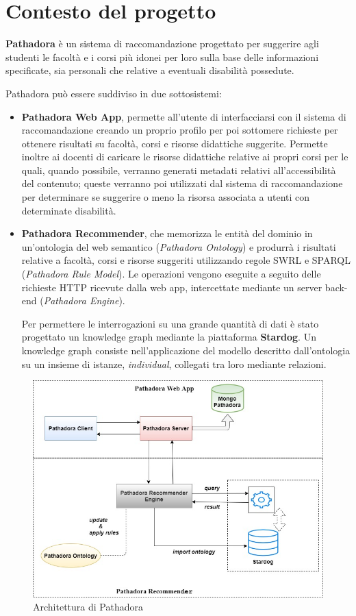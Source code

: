 \clearpage{\pagestyle{empty}\cleardoublepage}
\chapter{Contesto del progetto}
\textbf{Pathadora} è un sistema di raccomandazione progettato per suggerire agli studenti le facoltà e i corsi più idonei per loro sulla base delle informazioni specificate, sia personali che relative a eventuali disabilità possedute. 

Pathadora può essere suddiviso in due sottosistemi: 
\begin{itemize}
\item \textbf{Pathadora Web App}, permette all'utente di interfacciarsi con il sistema di raccomandazione creando un proprio profilo per poi sottomere richieste per ottenere risultati su facoltà, corsi e risorse didattiche suggerite. Permette inoltre ai docenti di caricare le risorse didattiche relative ai propri corsi per le quali, quando possibile, verranno generati metadati relativi all'accessibilità del contenuto; queste verranno poi utilizzati dal sistema di raccomandazione per determinare se suggerire o meno la risorsa associata a utenti con determinate disabilità.
\item \textbf{Pathadora Recommender}, che memorizza le entità del dominio in un'ontologia del web semantico (\textit{Pathadora Ontology}) e produrrà i risultati relative a facoltà, corsi e risorse suggeriti utilizzando regole SWRL e SPARQL (\textit{Pathadora Rule Model}). Le operazioni vengono eseguite a seguito delle richieste HTTP ricevute dalla web app, intercettate mediante un server back-end (\textit{Pathadora Engine}).

Per permettere le interrogazioni su una grande quantità di dati è stato progettato un knowledge graph mediante la piattaforma \textbf{Stardog}. Un knowledge graph consiste nell'applicazione del modello descritto dall'ontologia su un insieme di istanze, \textit{individual}, collegati tra loro mediante relazioni.
\end{itemize}

\begin{figure}[H]
\centering
\includegraphics[scale=0.4]{res/pathadora-arch.jpg}
\caption{Architettura di Pathadora}
\label{fig:pathadora-arch}
\end{figure}

